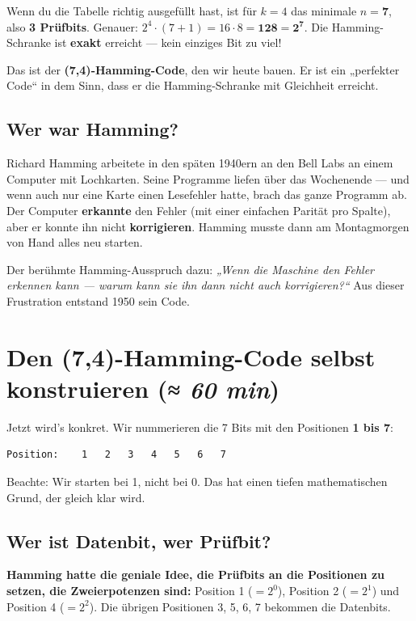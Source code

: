 Wenn du die Tabelle richtig ausgefüllt hast, ist für $k = 4$ das
minimale $n = \mathbf{7}$, also \textbf{3 Prüfbits}. Genauer:
$2^4 \cdot (7+1) = 16 \cdot 8 = \mathbf{128 = 2^7}$. Die
Hamming-Schranke ist \textbf{exakt} erreicht — kein einziges Bit zu
viel!

Das ist der \textbf{(7,4)-Hamming-Code}, den wir heute bauen. Er ist
ein „perfekter Code“ in dem Sinn, dass er die Hamming-Schranke mit
Gleichheit erreicht.

\subsection*{Wer war Hamming?}

Richard Hamming arbeitete in den späten 1940ern an den Bell Labs an
einem Computer mit Lochkarten. Seine Programme liefen über das
Wochenende — und wenn auch nur eine Karte einen Lesefehler hatte, brach
das ganze Programm ab. Der Computer \textbf{erkannte} den Fehler (mit
einer einfachen Parität pro Spalte), aber er konnte ihn nicht
\textbf{korrigieren}. Hamming musste dann am Montagmorgen von Hand alles
neu starten.

Der berühmte Hamming-Ausspruch dazu: \emph{„Wenn die Maschine den Fehler
erkennen kann — warum kann sie ihn dann nicht auch korrigieren?“} Aus
dieser Frustration entstand 1950 sein Code.

\section{Den (7,4)-Hamming-Code selbst konstruieren \normalfont(\textit{≈ 60 min})}

Jetzt wird's konkret. Wir nummerieren die 7 Bits mit den Positionen
\textbf{1 bis 7}:

\begin{verbatim}
Position:    1   2   3   4   5   6   7
\end{verbatim}

Beachte: Wir starten bei 1, nicht bei 0. Das hat einen tiefen
mathematischen Grund, der gleich klar wird.

\subsection*{Wer ist Datenbit, wer Prüfbit?}

\textbf{Hamming hatte die geniale Idee, die Prüfbits an die Positionen
zu setzen, die Zweierpotenzen sind:} Position 1 ($= 2^0$), Position 2
($= 2^1$) und Position 4 ($= 2^2$). Die übrigen Positionen 3, 5, 6, 7
bekommen die Datenbits.

